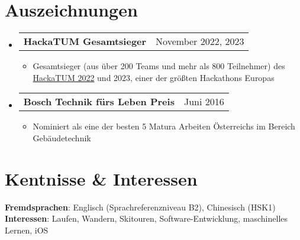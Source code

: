 \documentclass[letterpaper,11pt]{article}
\makeatletter
\newcommand{\resumeItem}[1]{
  \item\small{
    {#1 \vspace{-2pt}}
  }
}
\newcommand{\resumeSubheading}[4]{
  \vspace{-2pt}\item
    \begin{tabular*}{0.97\textwidth}[t]{l@{\extracolsep{\fill}}r}
      \textbf{#1} & #2 \\
      \textit{\small#3} & \textit{\small #4} \\
    \end{tabular*}\vspace{-7pt}
}
\newcommand{\resumeProjectHeading}[2]{
    \item
    \begin{tabular*}{0.97\textwidth}{l@{\extracolsep{\fill}}r}
      \small#1 & #2 \\
    \end{tabular*}\vspace{-7pt}
}
\newcommand{\resumeSubHeadingListStart}{\begin{itemize}[leftmargin=0.15in, label={}]}
\newcommand{\resumeSubHeadingListEnd}{\end{itemize}}
\newcommand{\resumeItemListStart}{\begin{itemize}}
\newcommand{\resumeItemListEnd}{\end{itemize}\vspace{-5pt}}
\makeatother
\begin{document}
\section{Auszeichnungen}
\resumeSubHeadingListStart
\resumeProjectHeading
{\textbf{HackaTUM Gesamtsieger}}{November 2022, 2023}
  \resumeItemListStart
    \resumeItem{Gesamtsieger (aus über 200 Teams und mehr als 800 Teilnehmer) des \href{https://devpost.com/software/sixtcharge}{HackaTUM 2022} und 2023, einer der größten Hackathons Europas}
  \resumeItemListEnd
  \resumeProjectHeading
  {\textbf{Bosch Technik fürs Leben Preis}}{Juni 2016}
  \resumeItemListStart
    \resumeItem{Nominiert als eine der besten 5 Matura Arbeiten Österreichs im Bereich Gebäudetechnik}
  \resumeItemListEnd
\resumeSubHeadingListEnd


\section{Kentnisse \& Interessen}
 \begin{itemize}[leftmargin=0.15in, label={}]
    \small{\item{
      \textbf{Fremdsprachen}{: Englisch (Sprachreferenzniveau B2), Chinesisch (HSK1)} \\
     \textbf{Interessen}{: Laufen, Wandern, Skitouren, Software-Entwicklung, maschinelles Lernen, iOS}
    }}
 \end{itemize}

\end{document}

